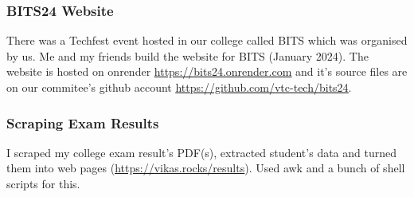 \documentclass[letterpaper,12pt]{extarticle}
\begin{document}
\subsubsection{BITS24 Website}
There was a Techfest event hosted in our college called BITS which was organised by us. Me and my friends build the website for BITS (January 2024). The website is hosted on onrender \underline{\url{https://bits24.onrender.com}} and it's source files are on our commitee's github account \underline{\url{https://github.com/vtc-tech/bits24}}.

\subsubsection{Scraping Exam Results} I scraped my college exam result's PDF(s), extracted student's data and turned them into web pages (\underline{\url{https://vikas.rocks/results}}). Used awk and a bunch of shell scripts for this.
\end{document}
